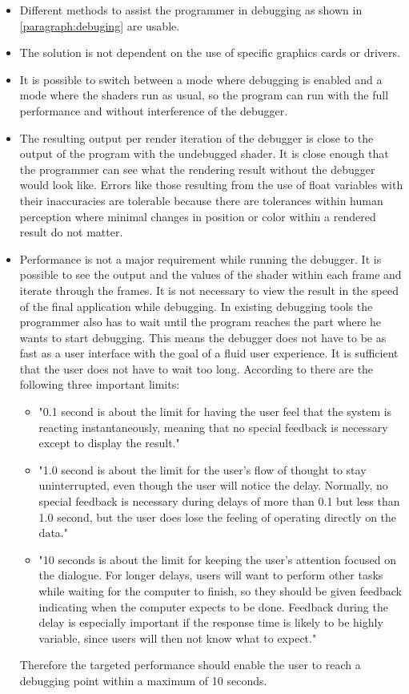 \begin{itemize}
	\item Different methods to assist the programmer in debugging as shown in \autoref{paragraph:debuging} are usable.
	\item The solution is not dependent on the use of specific graphics cards or drivers.
	\item It is possible to switch between a mode where debugging is enabled and a mode where the shaders run as usual, so the program can run with the full performance and without interference of the debugger.
	\item The resulting output per render iteration of the debugger is close to the output of the program with the undebugged shader. It is close enough that the programmer can see what the rendering result without the debugger would look like. Errors like those resulting from the use of float variables with their inaccuracies are tolerable because there are tolerances within human perception where minimal changes in position or color within a rendered result do not matter.
	\item Performance is not a major requirement while running the debugger. It is possible to see the output and the values of the shader within each frame and iterate through the frames. It is not necessary to view the result in the speed of the final application while debugging. In existing debugging tools the programmer also has to wait until the program reaches the part where he wants to start debugging. This means the debugger does not have to be as fast as a user interface with the goal of a fluid user experience. It is sufficient that the user does not have to wait too long. According to  there are the following three important limits:
	\begin{itemize}
	\item "0.1 second is about the limit for having the user feel that the system is reacting instantaneously, meaning that no special feedback is necessary except to display the result."
	\item "1.0 second is about the limit for the user's flow of thought to stay uninterrupted, even though the user will notice the delay. Normally, no special feedback is necessary during delays of more than 0.1 but less than 1.0 second, but the user does lose the feeling of operating directly on the data."
    \item "10 seconds is about the limit for keeping the user's attention focused on the dialogue. For longer delays, users will want to perform other tasks while waiting for the computer to finish, so they should be given feedback indicating when the computer expects to be done. Feedback during the delay is especially important if the response time is likely to be highly variable, since users will then not know what to expect."
	\end{itemize}
	Therefore the targeted performance should enable the user to reach a debugging point within a maximum of 10 seconds.
\end{itemize}




